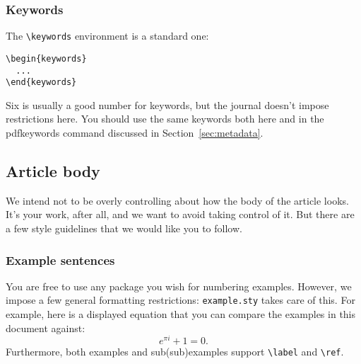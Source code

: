 \documentclass[lucida,final]{sp}
\newcommand{\spfile}[1]{\texttt{#1}}
\newcommand{\cmd}[1]{\texttt{\textbackslash#1}}
\begin{document}
\subsubsection{Keywords}

The \cmd{keywords} environment is a standard one:
%
\begin{Verbatim}
\begin{keywords}
  ...  
\end{keywords}
\end{Verbatim}
%
Six is usually a good number for keywords, but the journal doesn't
impose restrictions here. You should use the same keywords both here
and in the pdfkeywords command discussed in Section~\ref{sec:metadata}.


\subsection{Article body}

We intend not to be overly controlling about how the body of the
article looks.  It's your work, after all, and we want to avoid taking
control of it.  But there are a few style guidelines that we would
like you to follow.


\subsubsection{Example sentences}\label{sec:examples}

You are free to use any package you wish for numbering examples.
However, we impose a few general formatting restrictions:
%
\spfile{example.sty} takes care of this.  For example, here is a
displayed equation that you can compare the examples in this document
against:
%
\begin{equation}
  e^{\pi i} + 1 = 0.
\end{equation}
%
Furthermore, both examples and sub(sub)examples support \cmd{label}
and \cmd{ref}.
\end{document}

